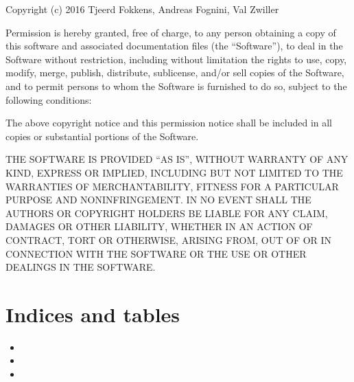\documentclass[letterpaper,10pt,english]{sphinxmanual}
\begin{document}
Copyright (c) 2016 Tjeerd Fokkens, Andreas Fognini, Val Zwiller

Permission is hereby granted, free of charge, to any person obtaining a copy of this software and associated documentation files (the ``Software''), to deal in the Software without restriction, including without limitation the rights to use, copy, modify, merge, publish, distribute, sublicense, and/or sell copies of the Software, and to permit persons to whom the Software is furnished to do so, subject to the following conditions:

The above copyright notice and this permission notice shall be included in all copies or substantial portions of the Software.

THE SOFTWARE IS PROVIDED ``AS IS'', WITHOUT WARRANTY OF ANY KIND, EXPRESS OR IMPLIED, INCLUDING BUT NOT LIMITED TO THE WARRANTIES OF MERCHANTABILITY, FITNESS FOR A PARTICULAR PURPOSE AND NONINFRINGEMENT. IN NO EVENT SHALL THE AUTHORS OR COPYRIGHT HOLDERS BE LIABLE FOR ANY CLAIM, DAMAGES OR OTHER LIABILITY, WHETHER IN AN ACTION OF CONTRACT, TORT OR OTHERWISE, ARISING FROM, OUT OF OR IN CONNECTION WITH THE SOFTWARE OR THE USE OR OTHER DEALINGS IN THE SOFTWARE.


\chapter{Indices and tables}
\label{index:indices-and-tables}\begin{itemize}
\item {} 

\item {} 

\item {} 

\end{itemize}



\renewcommand{\indexname}{Index}
\printindex
\end{document}
